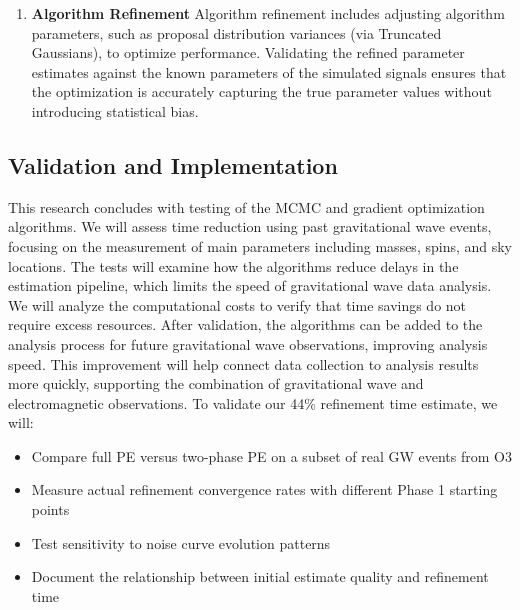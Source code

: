\documentclass[12pt]{article}
\begin{document}
\begin{enumerate}
    \begin{enumerate}
      \item Processing 'start-of-run' noisy data to obtain preliminary parameter estimates.
      \item Refining estimates with 'end-of-run' data, reflecting cleaner signal conditions.
      \item Evaluating the computational efficiency and accuracy of this two-step estimation process.
    \end{enumerate}

    The success of this two-stage estimation process will be gauged by the accuracy of parameters obtained and the reduction in computational time and resources.

    \item \textbf{Algorithm Refinement}
    Algorithm refinement includes adjusting algorithm parameters, such as proposal distribution variances (via Truncated Gaussians), to optimize performance. Validating the refined parameter estimates against the known parameters of the simulated signals ensures that the optimization is accurately capturing the true parameter values without introducing statistical bias.

\end{enumerate}

\subsection{Validation and Implementation}
This research concludes with testing of the MCMC and gradient optimization algorithms. We will assess time reduction using past gravitational wave events, focusing on the measurement of main parameters including masses, spins, and sky locations. The tests will examine how the algorithms reduce delays in the estimation pipeline, which limits the speed of gravitational wave data analysis. We will analyze the computational costs to verify that time savings do not require excess resources. After validation, the algorithms can be added to the analysis process for future gravitational wave observations, improving analysis speed. This improvement will help connect data collection to analysis results more quickly, supporting the combination of gravitational wave and electromagnetic observations.
To validate our 44\% refinement time estimate, we will:
\begin{itemize}
    \item Compare full PE versus two-phase PE on a subset of real GW events from O3
    \item Measure actual refinement convergence rates with different Phase 1 starting points
    \item Test sensitivity to noise curve evolution patterns
    \item Document the relationship between initial estimate quality and refinement time
\end{itemize}
\end{document}

